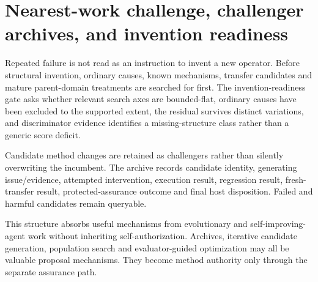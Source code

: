 \section{Nearest-work challenge, challenger archives, and invention readiness}

Repeated failure is not read as an instruction to invent a new operator. Before structural invention, ordinary causes, known mechanisms, transfer candidates and mature parent-domain treatments are searched for first. The invention-readiness gate asks whether relevant search axes are bounded-flat, ordinary causes have been excluded to the supported extent, the residual survives distinct variations, and discriminator evidence identifies a missing-structure class rather than a generic score deficit.

Candidate method changes are retained as challengers rather than silently overwriting the incumbent. The archive records candidate identity, generating issue/evidence, attempted intervention, execution result, regression result, fresh-transfer result, protected-assurance outcome and final host disposition. Failed and harmful candidates remain queryable.

This structure absorbs useful mechanisms from evolutionary and self-improving-agent work without inheriting self-authorization. Archives, iterative candidate generation, population search and evaluator-guided optimization may all be valuable proposal mechanisms. They become method authority only through the separate assurance path.

